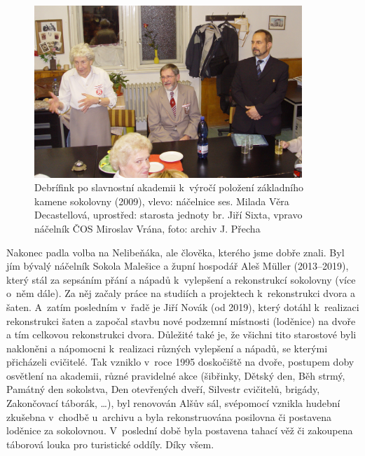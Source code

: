 \documentclass[a5paper, 11pt, twoside]{article}
\begin{document}
\begin{figure}[h!]
  \centering 
  \includegraphics[width=0.9\textwidth]{img/49_debrifink.JPG}
  \caption*{Debrífink po slavnostní akademii k~výročí položení základního
  kamene sokolovny (2009), vlevo: náčelnice ses. Milada Věra Decastellová,
  uprostřed: starosta jednoty br. Jiří Sixta, vpravo náčelník ČOS Miroslav
  Vrána, foto: archiv J. Přecha}
\end{figure}

Nakonec padla volba na Nelibeňáka, ale člověka, kterého jsme
dobře znali. Byl jím bývalý náčelník Sokola Malešice a župní hospodář
Aleš Müller (2013--2019), který stál za sepsáním přání a
nápadů k~vylepšení a rekonstrukcí sokolovny (více o~něm dále). Za něj
začaly práce na studiích a projektech k~rekonstrukci dvora a šaten.
A~zatím posledním v~řadě je Jiří Novák (od 2019), který dotáhl k~realizaci
rekonstrukci šaten a započal stavbu nové podzemní místnosti (loděnice)
na dvoře a tím celkovou rekonstrukci dvora. Důležité také je, že všichni
tito starostové byli nakloněni a nápomocni k~realizaci různých vylepšení
a nápadů, se kterými přicházeli cvičitelé. Tak vzniklo v~roce 1995
doskočiště na dvoře, postupem doby osvětlení na akademii, různé
pravidelné akce (šibřinky, Dětský den, Běh strmý, Památný den sokolstva,
Den otevřených dveří, Silvestr cvičitelů, brigády, Zakončovací táborák,
\ldots), byl renovován Alšův sál, svépomocí vznikla hudební zkušebna
v~chodbě u~archivu a byla rekonstruována posilovna či postavena loděnice
za sokolovnou. V~poslední době byla postavena tahací věž či zakoupena
táborová louka pro turistické oddíly. Díky všem.
\end{document}
